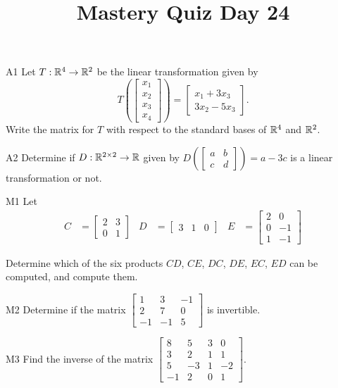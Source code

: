 \documentclass{sbgLAquiz}
\title{Mastery Quiz Day 24 }
\begin{document}
\begin{problem}{A1}
Let $T: \mathbb{R}^4 \rightarrow \mathbb{R}^2$ be the linear transformation given by $$T\left(\begin{bmatrix} x_1 \\ x_2 \\ x_3 \\ x_4 \end{bmatrix} \right) = \begin{bmatrix} x_1+3x_3 \\ 3x_2-5x_3 \end{bmatrix}.$$ Write the matrix for $T$ with respect to the standard bases of $\mathbb{R}^4$ and $\mathbb{R}^2$.
\end{problem}

\begin{problem}{A2}
Determine if $D: \mathbb{R}^{2\times 2} \rightarrow \mathbb{R}$ given by $D\left(\begin{bmatrix} a & b \\ c & d \end{bmatrix} \right) = a-3c$ is a linear transformation or not.
\end{problem}
\newpage

\begin{problem}{M1}
Let
\begin{align*}
C &= \begin{bmatrix} 2 & 3 \\ 0 & 1 \end{bmatrix} & D&= \begin{bmatrix} 3 & 1 & 0 \end{bmatrix} & E&= \begin{bmatrix} 2 & 0 \\ 0 & -1 \\ 1 & -1 \end{bmatrix}
\end{align*}

Determine which of the six products $CD$, $CE$, $DC$, $DE$, $EC$, $ED$ can be computed, and compute them.
\end{problem}

\begin{problem}{M2} Determine if the matrix $\begin{bmatrix} 1 & 3 & -1 \\ 2 & 7 & 0 \\ -1 & -1 & 5 \end{bmatrix}$ is invertible.
\end{problem}
\newpage

\begin{problem}{M3}
Find the inverse of the matrix $\begin{bmatrix} 8 & 5 & 3 & 0 \\ 3 & 2 & 1 & 1 \\ 5 & -3 & 1 & -2 \\ -1 & 2 & 0 & 1\end{bmatrix} $.
\end{problem}
\end{document}
